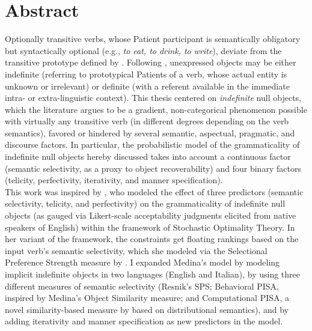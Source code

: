 \chapter*{Abstract}

Optionally transitive verbs, whose Patient participant is semantically obligatory but syntactically optional (e.g., \textit{to eat, to drink, to write}), deviate from the transitive prototype defined by \textcite{HopperThompson1980}. Following \textcite{Fillmore1986}, unexpressed objects may be either indefinite (referring to prototypical Patients of a verb, whose actual entity is unknown or irrelevant) or definite (with a referent available in the immediate intra- or extra-linguistic context). This thesis centered on \textit{indefinite} null objects, which the literature argues to be a gradient, non-categorical phenomenon possible with virtually any transitive verb (in different degrees depending on the verb semantics), favored or hindered by several semantic, aspectual, pragmatic, and discourse factors. In particular, the probabilistic model of the grammaticality of indefinite null objects hereby discussed takes into account a continuous factor (semantic selectivity, as a proxy to object recoverability) and four binary factors (telicity, perfectivity, iterativity, and manner specification).\\
This work was inspired by \textcite{Medina2007}, who modeled the effect of three predictors (semantic selectivity, telicity, and perfectivity) on the grammaticality of indefinite null objects (as gauged via Likert-scale acceptability judgments elicited from native speakers of English) within the framework of Stochastic Optimality Theory. In her variant of the framework, the constraints get floating rankings based on the input verb's semantic selectivity, which she modeled via the Selectional Preference Strength measure by \textcite{Resnik1993, Resnik1996}. I expanded Medina's model by modeling implicit indefinite objects in two languages (English and Italian), by using three different measures of semantic selectivity (Resnik's SPS; Behavioral PISA, inspired by Medina's Object Similarity measure; and Computational PISA, a novel similarity-based measure by \textcite{CappelliLenciPISA} based on distributional semantics), and by adding iterativity and manner specification as new predictors in the model.\\ %
